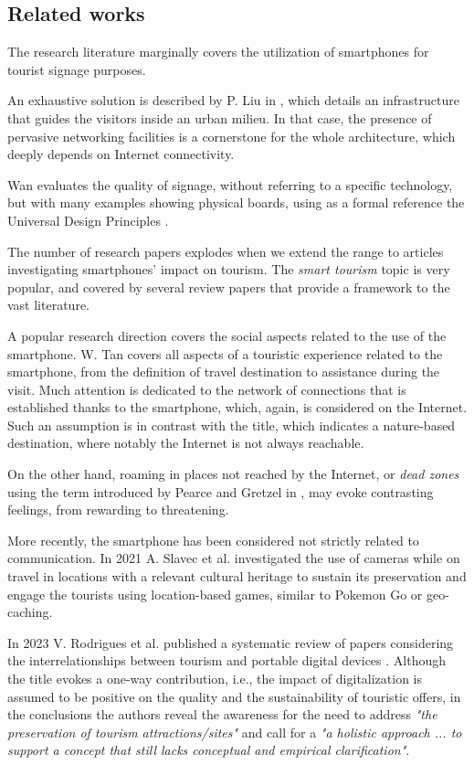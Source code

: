 \documentclass[sustainability,article,submit,pdftex,moreauthors]{Definitions/mdpi}
\begin{document}

\subsection{Related works}

The research literature marginally covers the utilization of smartphones for tourist signage purposes.

An exhaustive solution is described by P. Liu in \cite{liu16a}, which details an infrastructure that guides the visitors inside an urban milieu. In that case, the presence of pervasive networking facilities is a cornerstone for the whole architecture, which deeply depends on Internet connectivity. 

Wan \cite{wan22a} evaluates the quality of signage, without referring to a specific technology, but with many examples showing physical boards, using as a formal reference the Universal Design Principles \cite{udi97a}.

The number of research papers explodes when we extend the range to articles investigating smartphones' impact on tourism. The {\em smart tourism} topic is very popular, and covered by several review papers that provide a framework to the vast literature.

A popular research direction covers the social aspects related to the use of the smartphone. W. Tan \cite{tan17a} covers all aspects of a touristic experience related to the smartphone, from the definition of travel destination to assistance during the visit. Much attention is dedicated to the network of connections that is established thanks to the smartphone, which, again, is considered on the Internet. Such an assumption is in contrast with the title, which indicates a nature-based destination, where notably the Internet is not always reachable.

On the other hand, roaming in places not reached by the Internet, or {\em dead zones} using the term introduced by Pearce and Gretzel in \cite{pea12a}, may evoke contrasting feelings, from rewarding to threatening.

More recently, the smartphone has been considered not strictly related to communication. In 2021 A. Slavec et al. investigated the use of cameras \cite{sla21a} while on travel in locations with a relevant cultural heritage to sustain its preservation and engage the tourists using location-based games, similar to Pokemon Go or geo-caching.

In 2023 V. Rodrigues et al. published a systematic review of papers considering the interrelationships between tourism and portable digital devices \cite{rod23a}. Although the title evokes a one-way contribution, i.e., the impact of digitalization is assumed to be positive on the quality and the sustainability of touristic offers, in the conclusions the authors reveal the awareness for the need to address {\em "the preservation of tourism attractions/sites"} and call for a {\em "a holistic approach ... to support a concept that still lacks conceptual and empirical clarification"}.
\end{document}
